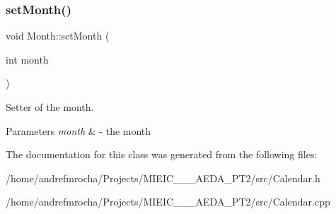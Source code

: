 \subsubsection{\texorpdfstring{set\+Month()}{setMonth()}}
{\footnotesize\ttfamily void Month\+::set\+Month (\begin{DoxyParamCaption}\item[{int}]{month }\end{DoxyParamCaption})}



Setter of the month. 


\begin{DoxyParams}{Parameters}
{\em month} & -\/ the month \\
\hline
\end{DoxyParams}


The documentation for this class was generated from the following files\+:\begin{DoxyCompactItemize}
\item 
/home/andrefmrocha/\+Projects/\+M\+I\+E\+I\+C\+\_\+\_\+\_\+\+A\+E\+D\+A\+\_\+\+P\+T2/src/Calendar.\+h\item 
/home/andrefmrocha/\+Projects/\+M\+I\+E\+I\+C\+\_\+\_\+\_\+\+A\+E\+D\+A\+\_\+\+P\+T2/src/Calendar.\+cpp\end{DoxyCompactItemize}
